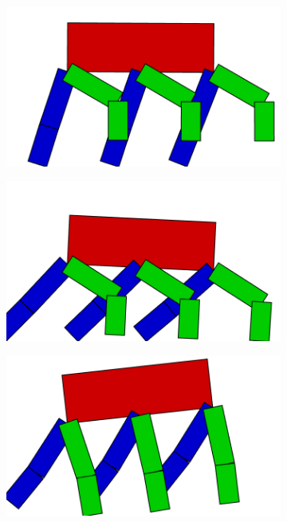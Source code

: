 \begin{figure}[H]
        \begin{subfigure}[b]{0.3\textwidth}
          \includegraphics[width=\linewidth,center]{graphics/movement/45}
          \caption{\label{fig:ConceptMovement45}}
        \end{subfigure}
        \hspace{\fill}
        \begin{subfigure}[b]{0.3\textwidth}
          \includegraphics[width=\linewidth,center]{graphics/movement/50}
          \caption{\label{fig:ConceptMovement50}}
        \end{subfigure}
        \hspace{\fill}
        \begin{subfigure}[b]{0.3\textwidth}
          \includegraphics[width=\linewidth,center]{graphics/movement/55}
          \caption{\label{fig:ConceptMovement55}}
        \end{subfigure}


\end{figure}
